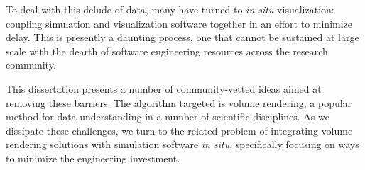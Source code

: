 To deal with this delude of data, many have turned to \textit{in situ}
visualization: coupling simulation and visualization software together
in an effort to minimize delay.  This is presently a daunting process,
one that cannot be sustained at large scale with the dearth of software
engineering resources across the research community.

This dissertation presents a number of community-vetted ideas aimed at
removing these barriers.  The algorithm targeted is volume rendering,
a popular method for data understanding in a number of scientific
disciplines.  As we dissipate these challenges, we turn to the related
problem of integrating volume rendering solutions with
simulation software \textit{in situ}, specifically focusing on ways to
minimize the engineering investment.
